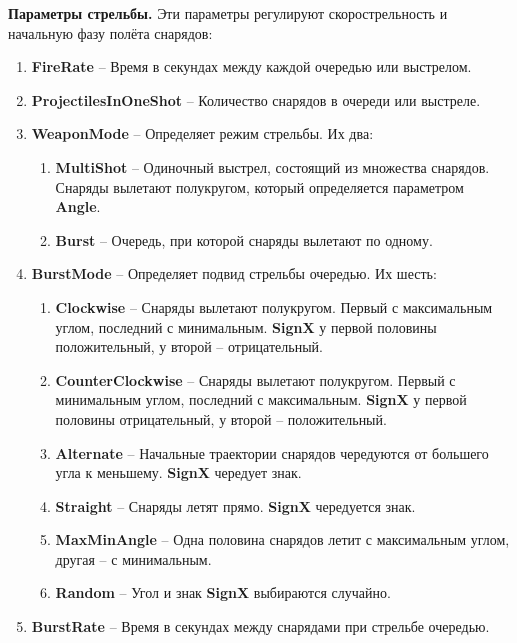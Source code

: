 \textbf{Параметры стрельбы.} Эти параметры регулируют скорострельность и начальную фазу полёта снарядов:
\begin{enumerate}
    \item {\small \textbf{FireRate}} -- Время в секундах между каждой очередью или выстрелом.
    \item {\small \textbf{ProjectilesInOneShot}} -- Количество снарядов в очереди или выстреле.
    \item {\small \textbf{WeaponMode}} -- Определяет режим стрельбы. Их два:
    \begin{enumerate}[label=\textbullet]
        \item {\small \textbf{MultiShot}} -- Одиночный выстрел, состоящий из множества снарядов. Снаряды вылетают полукругом, который определяется параметром {\small \textbf{Angle}}.
        \item {\small \textbf{Burst}} -- Очередь, при которой снаряды вылетают по одному.
    \end{enumerate}
    \item {\small \textbf{BurstMode}} -- Определяет подвид стрельбы очередью. Их шесть:
    \begin{enumerate}[label=\textbullet]
        \item {\small \textbf{Clockwise}} -- Снаряды вылетают полукругом. Первый с максимальным углом, последний с минимальным. {\small \textbf{SignX}} у первой половины положительный, у второй -- отрицательный.
        \item {\small \textbf{CounterClockwise}} -- Снаряды вылетают полукругом. Первый с минимальным углом, последний с максимальным. {\small \textbf{SignX}} у первой половины отрицательный, у второй -- положительный.
        \item {\small \textbf{Alternate}} -- Начальные траектории снарядов чередуются от большего угла к меньшему. {\small \textbf{SignX}} чередует знак.
        \item {\small \textbf{Straight}} -- Снаряды летят прямо. {\small \textbf{SignX}} чередуется знак.
        \item {\small \textbf{MaxMinAngle}} -- Одна половина снарядов летит с максимальным углом, другая -- с минимальным.
        \item {\small \textbf{Random}} -- Угол и знак {\small \textbf{SignX}} выбираются случайно.
    \end{enumerate}
    \item {\small \textbf{BurstRate}} -- Время в секундах между снарядами при стрельбе очередью.
\end{enumerate}

